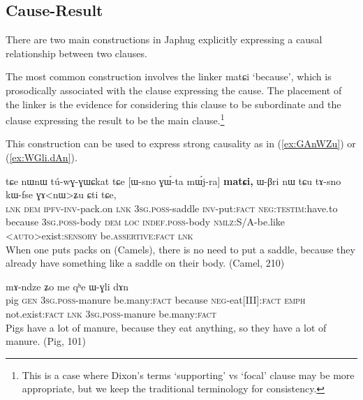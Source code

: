 \documentclass[oldfontcommands,oneside,a4paper,11pt]{article}
\newcommand{\ipa}[1]{{\phon \mbox{#1}}} %
\newcommand{\refb}[1]{(\ref{#1})}
\begin{document}
\subsection{Cause-Result} \label{sec:cause}
There are two main constructions in Japhug explicitly expressing a causal relationship between two clauses. 

The most common construction involves the linker \ipa{matɕi} `because', which is prosodically associated with the  clause expressing the cause.  The placement of the linker is the evidence for considering this clause to be subordinate and the clause expressing the result to be the main clause.\footnote{This is a case where Dixon's terms `supporting' vs `focal' clause may be more appropriate, but we keep the traditional terminology for consistency.}

This construction can be used to express strong causality as in \refb{ex:GAnWZu} or \refb{ex:WGli.dAn}.
\begin{exe}
\ex \label{ex:GAnWZu}
\gll 
\ipa{tɕe}   	\ipa{nɯnɯ}   	\ipa{tú-wɣ-ɣɯɕkat}   	\ipa{tɕe}   	[\ipa{ɯ-sno}   	\ipa{ɣɯ́-ta}   	\ipa{mɯ́j-ra}]   	\textbf{\ipa{matɕi,}}   	\ipa{ɯ-βri}   	\ipa{nɯ} \ipa{tɕu}   	\ipa{tɤ-sno}   	\ipa{kɯ-fse}   	\ipa{ɣɤ<nɯ>ʑu}   	\ipa{ɕti}   	\ipa{tɕe,}   \\
\textsc{lnk} \textsc{dem} \textsc{ipfv-inv}-pack.on \textsc{lnk} \textsc{3sg.poss}-saddle \textsc{inv}-put:\textsc{fact} \textsc{neg:testim}:have.to because   \textsc{3sg.poss}-body \textsc{dem} \textsc{loc} \textsc{indef.poss}-body \textsc{nmlz}:S/A-be.like <\textsc{auto}>exist:\textsc{sensory} be.\textsc{assertive}:\textsc{fact} \textsc{lnk} \\
\glt When one puts packs on (Camels), there is no need to put a saddle, because they already have something like a saddle on their body. (Camel, 210)
 \end{exe}
 
\begin{exe}
\ex \label{ex:WGli.dAn}
\gll [\ipa{paʁ}   	\ipa{ɣɯ}   	\ipa{ɯ-ɣli}   	\ipa{dɤn}]   	\ipa{\textbf{matɕi},}   	\ipa{mɤ-ndze}   	\ipa{ʑo}   	\ipa{me}   	\ipa{qʰe}   	\ipa{ɯ-ɣli}   	\ipa{dɤn}   \\
pig \textsc{gen} \textsc{3sg.poss}-manure be.many:\textsc{fact} because \textsc{neg}-eat[III]:\textsc{fact} \textsc{emph} not.exist:\textsc{fact} \textsc{lnk} \textsc{3sg.poss}-manure  be.many:\textsc{fact} \\
\glt Pigs have a lot of manure, because they eat anything, so they have a lot of manure. (Pig, 101)
\end{exe}
\end{document}
